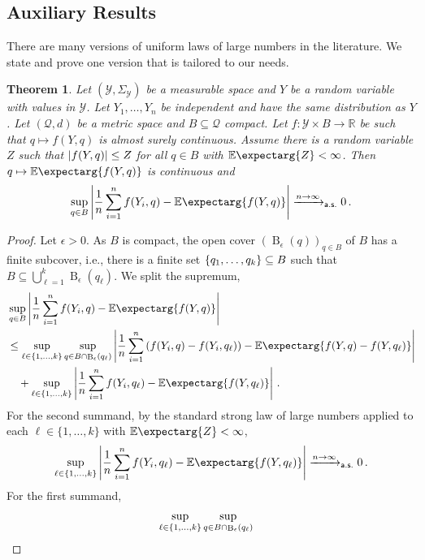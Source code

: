 \documentclass{scrartcl}
\renewcommand{\subset}{\subseteq}
\DeclareMathOperator{\ball}{\mathrm{B}}
\newcommand{\Ex}{\E\expectarg}
\newcommand*{\mc}[1]{\mathcal{#1}}
\newcommand*{\ms}[1]{\mathsf{#1}}
\newcommand{\R}{\mathbb{R}}
\newcommand{\equationFullstop}{\, .}
\newcommand{\eqfs}{\equationFullstop}
\theoremstyle{plain}\newtheorem{theorem}{Theorem}[section]
\theoremstyle{definition}
\theoremstyle{remark}
\begin{document}
\begin{appendix}
 \section{Auxiliary Results}\label{sec:aux}
There are many versions of uniform laws of large numbers in the literature. We state and prove one version that is tailored to our needs.
\begin{theorem}\label{thm:ULLN}
Let $(\mc Y, \Sigma_{\mc Y})$ be a measurable space and $Y$ be a random variable with values in $\mc Y$. Let $Y_1, \dots, Y_n$ be independent and have the same distribution as $Y$.
Let $(\mc Q, d)$ be a metric space and $B\subset \mc Q$ compact. 
Let $f \colon \mc Y \times B \to \R$ be such that $q \mapsto f(Y, q)$  is almost surely continuous. Assume there is a random variable $Z$ such that $\left| f(Y, q) \right| \leq Z$ for all $q \in B$ with $\Ex{Z} < \infty$. Then $q \mapsto \Ex{f(Y, q)}$ is continuous and 
\begin{equation*}
	\sup_{q\in B} \abs{\frac 1n \sum_{i=1}^n f(Y_i, q) - \Ex{f(Y, q)}} \xrightarrow{n\to\infty}_{\ms{a.s.}} 0 
	\eqfs
\end{equation*}
\end{theorem}
\begin{proof}
Let $\epsilon > 0$. As $B$ is compact, the open cover $(\ball_\epsilon(q))_{q \in B}$ of $B$ has a finite subcover, i.e., there is a finite set $\cb{q_1, \dots, q_k} \subset B$ such that $B \subset \bigcup_{\ell=1}^k\ball_\epsilon(q_\ell)$. We split the supremum,
\begin{align*}
	&\sup_{q\in B} \abs{\frac 1n \sum_{i=1}^n f(Y_i, q) - \Ex{f(Y, q)}}
	\\&\leq
	\sup_{\ell \in \cb{1,\dots, k}} 
	\sup_{q\in B \cap \ball_\epsilon(q_\ell)}
		\abs{\frac 1n \sum_{i=1}^n \br{f(Y_i, q) - f(Y_i, q_\ell)} - \Ex{f(Y, q) - f(Y, q_\ell)}}
	\\&\quad+ 
	\sup_{\ell \in \cb{1,\dots, k}} \abs{\frac 1n \sum_{i=1}^n f(Y_i, q_\ell) - \Ex{f(Y, q_\ell)}}
	\eqfs
\end{align*}
For the second summand, by the standard strong law of large numbers applied to each $\ell\in\{1,\dots,k\}$ with $\Ex{Z} < \infty$, 
\begin{align*}
\sup_{\ell \in \cb{1,\dots, k}} \abs{\frac 1n \sum_{i=1}^n f(Y_i, q_\ell) - \Ex{f(Y, q_\ell)}} \xrightarrow{n \to \infty}_{\ms{a.s.}} 0
\eqfs
\end{align*}
For the first summand,
\begin{align*}
	&\sup_{\ell \in \cb{1,\dots, k}} 
	\sup_{q\in B \cap \ball_\epsilon(q_\ell)}

\end{align*}
\end{proof}
\end{appendix}
\end{document}
